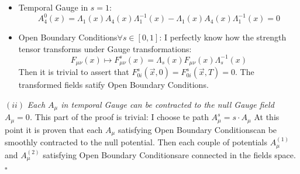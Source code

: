 \documentclass[english, LaM, oneside, noexaminfo]{sapthesis}
\newcommand{\obc}{Open Boundary Conditions}
\newcommand{\proved}{\newline \hspace*{.97\textwidth} $\square$}
\begin{document}
\begin{itemize}
    \item Temporal Gauge in $s=1$: $$A_4^0 (x) = \Lambda_1 (x) A_4 (x) \Lambda_1^{-1} (x) - \Lambda_1 (x) A_4 (x) \Lambda_1^{-1} (x) = 0$$
    \item \obc\space $\forall s \in [0,1]$: I perfectly know how the strength tensor transforms under Gauge transformations:
        $$F_{\mu\nu} (x) \mapsto F_{\mu\nu}^s (x) = \Lambda_s (x) F_{\mu\nu} (x) \Lambda_s^{-1} (x) $$
        Then it is trivial to assert that $F_{0i}^s (\vec x, 0) = F_{0i}^s (\vec x, T) = 0$.
        The transformed fields satify \obc.
\end{itemize}
$(ii)$ \textit{Each $A_\mu$ in temporal Gauge can be contracted to the null Gauge field $A_\mu = 0$.}
\newline
This part of the proof is trivial: I choose te path $A_\mu^s = s\cdot A_\mu$
\newline\newline
At this point it is proven that each $A_\mu$ satisfying \obc\space can be smoothly contracted to the null potential.
Then each couple of potentials $A_\mu^{(1)}$ and $A_\mu^{(2)}$ satisfying \obc\space are connected in the fields space.
\proved
\end{document}
